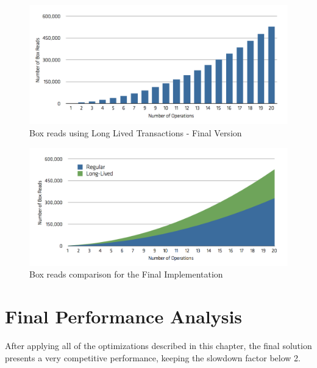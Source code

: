 \begin{figure}
\centering
\includegraphics[width=0.9\linewidth]{box-long-final}
\caption{Box reads using Long Lived Transactions - Final Version}
\label{fig:boxesFinal}
\end{figure}

\begin{figure}
\centering
\includegraphics[width=0.9\linewidth]{box-comparison-final}
\caption{Box reads comparison for the Final Implementation}
\label{fig:boxComparisonFinal}
\end{figure}


\section{Final Performance Analysis}

After applying all of the optimizations described in this chapter, the
final solution presents a very competitive performance, keeping the
slowdown factor below 2.
